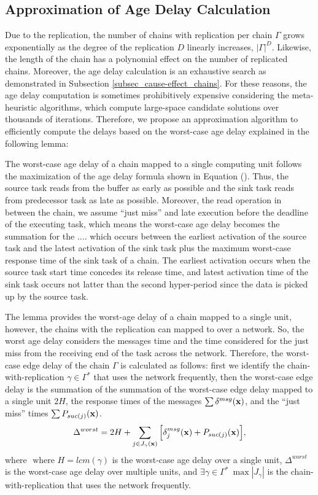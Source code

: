 \subsection{Approximation of Age Delay Calculation}\label{subsec_approximation_alg}
Due to the replication, the number of chains with replication per chain $\Gamma$ grows exponentially as the degree of the replication $D$ linearly increases, $|\Gamma|^D$. Likewise, the length of the chain has a polynomial effect on the number of replicated chains. Moreover, the age delay calculation is an exhaustive search as demonstrated in Subsection \ref{subsec_cause-effect_chains}. For these reasons, the age delay computation is sometimes prohibitively expensive considering the meta-heuristic algorithms, which compute large-space candidate solutions over thousands of iterations. Therefore, we propose an approximation algorithm to efficiently compute the delays based on the worst-case age delay explained in the following lemma:
\begin{lemma} 
	The worst-case age delay of a chain mapped to a single computing unit follows the maximization of the age delay formula shown in Equation (). Thus, the source task reads from the buffer as early as possible and the sink task reads from predecessor task as late as possible. Moreover, the read operation in between the chain, we assume ``just miss'' and late execution before the deadline of the executing task, which means the worst-case age delay becomes the summation for the .... which occurs between the earliest activation of the source task and the latest activation of the sink task plus the maximum worst-case response time of the sink task of a chain. The earliest activation occurs when the source task start time concedes its release time, and latest activation time of the sink task occurs not latter than the second hyper-period since the data is picked up by the source task. 
\end{lemma}

The lemma provides the worst-age delay of a chain mapped to a single unit, however, the chains with the replication can mapped to over a network. So, the worst age delay considers the messages time and the time considered for the just miss from the receiving end of the task across the network. Therefore, the worst-case edge delay of the chain $\Gamma$ is calculated as follows: first we identify the chain-with-replication $\gamma\in\Gamma^*$ that uses the network frequently, then the worst-case edge delay is the summation of the summation of the worst-case edge delay mapped to a single unit $2H$, the response times of the messages $\sum{\delta^{msg}(\textbf{x})}$, and the ``just miss'' times $\sum{P_{suc(j)}(\textbf{x})}$.
\begin{align}
\Delta^{worst}=2H+\sum_{j\in J_{\gamma}(\textbf{x})}{\Big[\delta^{msg}_j(\textbf{x})+P_{suc(j)}(\textbf{x})\Big]},
\end{align}
where $\mbox{ where } H=lcm(\gamma)$ is the worst-case age delay over a single unit, $\Delta^{worst}$ is the worst-case age delay over multiple units, and $\exists \gamma\in\Gamma^*\ \max{|J_\gamma|}$ is the chain-with-replication that uses the network frequently.

